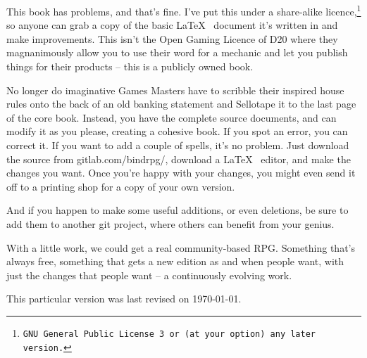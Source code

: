 \begin{multicols}{2}
\noindent
This book has problems, and that's fine.
I've put this under a share-alike licence,\footnote{\tt GNU General Public License 3 or (at your option) any later version.} so anyone can grab a copy of the basic \LaTeX~ document it's written in and make improvements.
This isn't the Open Gaming Licence of D20 where they magnanimously allow you to use their word for a mechanic and let you publish things for their products -- this is a publicly owned book.

No longer do imaginative Games Masters have to scribble their inspired house rules onto the back of an old banking statement and Sellotape it to the last page of the core book.
Instead, you have the complete source documents, and can modify it as you please, creating a cohesive book.
If you spot an error, you can correct it.
If you want to add a couple of spells, it's no problem.
Just download the source from gitlab.com/bindrpg/, download a \LaTeX~ editor, and make the changes you want.
Once you're happy with your changes, you might even send it off to a printing shop for a copy of your own version.

And if you happen to make some useful additions, or even deletions, be sure to add them to another git project, where others can benefit from your genius.

With a little work, we could get a real community-based RPG.
Something that's always free, something that gets a new edition as and when people want, with just the changes that people want -- a continuously evolving work.

This particular version was last revised on \today.

\end{multicols}
